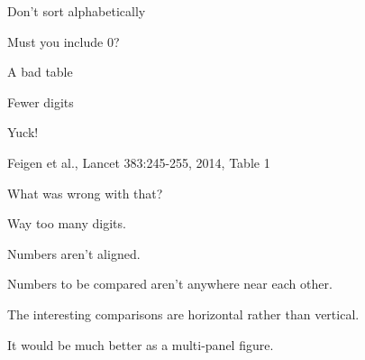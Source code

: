 \documentclass[aspectratio=169,12pt,t]{beamer}
\begin{document}
\begin{frame}[c]{Don't sort alphabetically}


\note{
}
\end{frame}





\begin{frame}[c]{Must you include 0?}


\note{
}
\end{frame}




\begin{frame}[c]{A bad table}


\note{
}
\end{frame}


\begin{frame}[c]{Fewer digits}


\note{
}
\end{frame}





\begin{frame}[c]{Yuck!}


\vspace{12pt}
\lolit \footnotesize \hfill
Feigen et al., Lancet 383:245-255, 2014, Table 1

\note{
}
\end{frame}

\begin{frame}{What was wrong with that?}

  \bbi
\item {\vhilit Way} too many digits.

\item Numbers aren't aligned.

\item Numbers to be compared aren't anywhere near each other.

\item The interesting comparisons are horizontal rather than
  vertical.

\item It would be much better as a multi-panel figure.
\ei

\note{
}
\end{frame}
\end{document}
